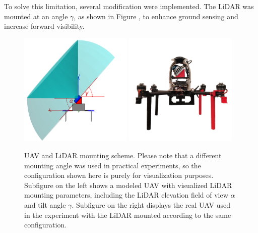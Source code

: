             To solve this limitation, several modification were implemented. 
            The \ac{LiDAR} was mounted at an angle $\gamma$, as shown in Figure , to enhance ground sensing and increase forward visibility.

            \begin{figure}[htbp]
                \centering
                \includegraphics[width=0.48\textwidth]{./fig/photos/uav_side_view.png}
                \includegraphics[width=0.48\textwidth]{./fig/photos/uav_photo.png}
                \caption{
                    \ac{UAV} and \ac{LiDAR} mounting scheme.
                    Please note that a different mounting angle was used in practical experiments, so the configuration shown here is purely for visualization purposes.
                    Subfigure on the left shows a modeled \ac{UAV} with visualized \ac{LiDAR} mounting parameters, including the \ac{LiDAR} elevation field of view $\alpha$ and tilt angle $\gamma$. 
                    Subfigure on the right displays the real \ac{UAV} used in the experiment with the \ac{LiDAR} mounted according to the same configuration.                                                
                }
                \label{fig:uavs}
            \end{figure}

